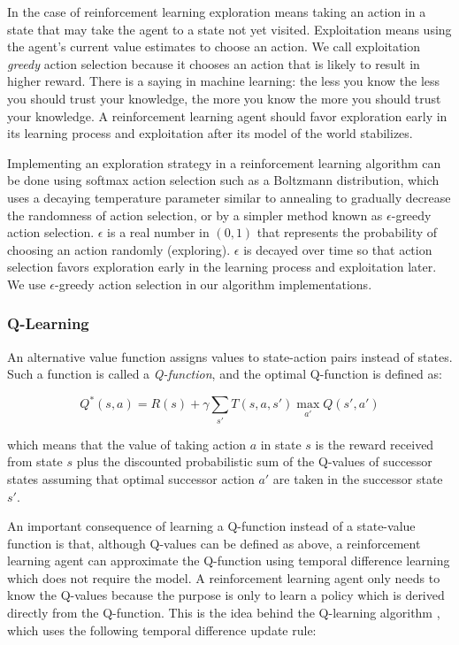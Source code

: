 In the case of reinforcement learning exploration means taking an action in a state that may take the agent to a state not yet visited. Exploitation means using the agent's current value estimates to choose an action. We call exploitation {\it greedy} action selection because it chooses an action that is likely to result in higher reward. There is a saying in machine learning: the less you know the less you should trust your knowledge, the more you know the more you should trust your knowledge. A reinforcement learning agent should favor exploration early in its learning process and exploitation after its model of the world stabilizes.

Implementing an exploration strategy in a reinforcement learning algorithm can be done using softmax action selection such as a Boltzmann distribution, which uses a decaying temperature parameter similar to annealing to gradually decrease the randomness of action selection, or by a simpler method known as $\epsilon$-greedy action selection.  $\epsilon$ is a real number in $(0, 1)$ that represents the probability of choosing an action randomly (exploring). $\epsilon$ is decayed over time so that action selection favors exploration early in the learning process and exploitation later. We use $\epsilon$-greedy action selection in our algorithm implementations.

\subsubsection{Q-Learning}

An alternative value function assigns values to state-action pairs instead of states. Such a function is called a {\it Q-function}, and the optimal Q-function is defined as:

\begin{equation}
Q^*(s, a) = R(s) + \gamma \sum_{s'} T(s, a, s') \max_{a'} Q(s', a')
\end{equation}

which means that the value of taking action $a$ in state $s$ is the reward received from state $s$ plus the discounted probabilistic sum of the Q-values of successor states assuming that optimal successor action $a'$ are taken in the successor state $s'$.

An important consequence of learning a Q-function instead of a state-value function is that, although Q-values can be defined as above, a reinforcement learning agent can approximate the Q-function using temporal difference learning which does not require the model. A reinforcement learning agent only needs to know the Q-values because the purpose is only to learn a policy which is derived directly from the Q-function. This is the idea behind the Q-learning algorithm \cite{watkins1989models}, which uses the following temporal difference update rule:

